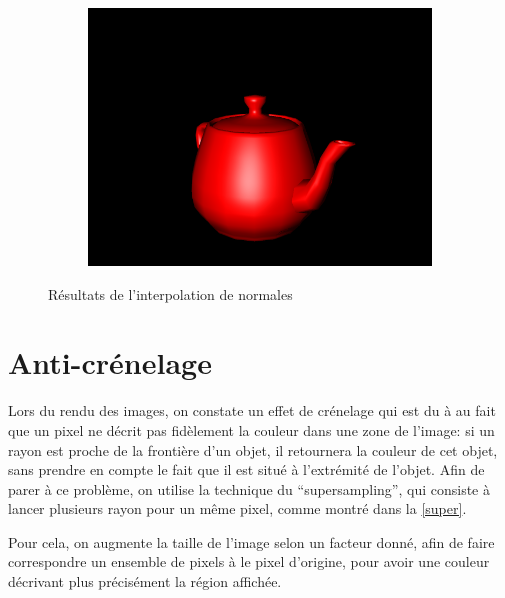 \documentclass{article}
\begin{document}
\begin{figure}[hb]
  \begin{subfigure}{0.45\textwidth}
    \includegraphics[width=1\textwidth]{images/nres1.png}
  \end{subfigure}

  \caption{Résultats de l'interpolation de normales\label{normal}}
\end{figure}

\section{Anti-crénelage}

Lors du rendu des images, on constate un effet de crénelage qui est du à au
fait que un pixel ne décrit pas fidèlement la couleur dans une zone de l'image:
si un rayon est proche de la frontière d'un objet, il retournera la couleur de
cet objet, sans prendre en compte le fait que il est situé à l'extrémité de
l'objet. Afin de parer à ce problème, on utilise la technique du
``supersampling'', qui consiste à lancer plusieurs rayon pour un même pixel,
comme montré dans la \cref{super}.

Pour cela, on augmente la taille de l'image selon un facteur donné, afin de
faire correspondre un ensemble de pixels à le pixel d'origine, pour avoir une
couleur décrivant plus précisément la région affichée.
\end{document}
